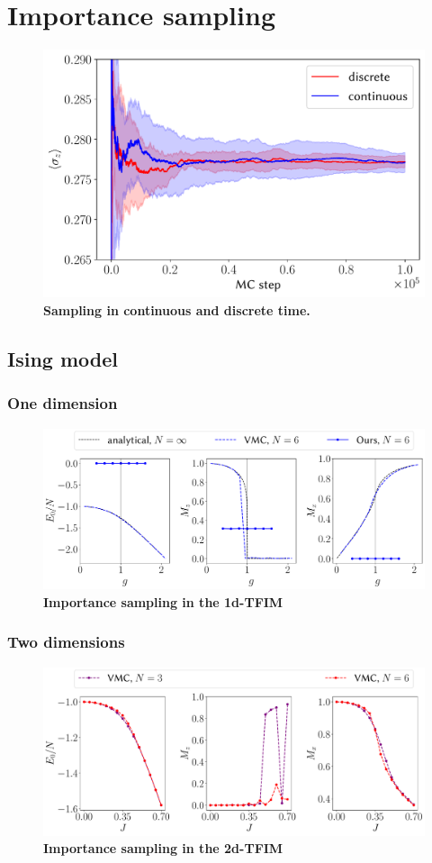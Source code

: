 \section{Importance sampling}
\begin{figure}[H]
	\centering
	\includegraphics[width=0.65\linewidth]{Chapter5/Figs/Vector/sampling_example}
	\caption[Sampling in continuous and discrete time]{\textbf{Sampling in continuous and discrete time.}}
	\label{fig:samplingexample}
\end{figure}

\subsection{Ising model}
\subsubsection{One dimension}
\begin{figure}[H]
	\centering
	\includegraphics[width=\linewidth]{Chapter5/Figs/Vector/tfim1d_finite_scaling}
	\caption[Importance sampling in the 1d-TFIM]{\textbf{Importance sampling in the 1d-TFIM}}
	\label{fig:tfim1dfinitescaling}
\end{figure}

\subsubsection{Two dimensions}
\begin{figure}[H]
	\centering
	\includegraphics[width=\linewidth]{Chapter5/Figs/Vector/tfim2d_finite_scaling}
	\caption[Importance sampling in the 2d-TFIM]{\textbf{Importance sampling in the 2d-TFIM}}
	\label{fig:tfim2dfinitescaling}
\end{figure}

